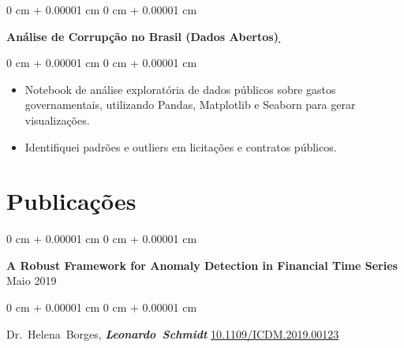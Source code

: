 \documentclass[10pt, letterpaper]{article}
\newenvironment{highlights}{
    \begin{itemize}[
        topsep=0.10 cm,
        parsep=0.10 cm,
        partopsep=0pt,
        itemsep=0pt,
        leftmargin=0 cm + 10pt
    ]
}{
    \end{itemize}
}
\newenvironment{onecolentry}{
    \begin{adjustwidth}{
        0 cm + 0.00001 cm
    }{
        0 cm + 0.00001 cm
    }
}{
    \end{adjustwidth}
}
\begin{document}
    \begin{onecolentry}
        \textbf{Análise de Corrupção no Brasil (Dados Abertos)}\href{https://github.com/leoschmidt/analise-corrupcao-br}{\, \faGithub}
    \end{onecolentry}
    \vspace{0.10cm}
    \begin{onecolentry}
        \begin{highlights}
                    \item Notebook de análise exploratória de dados públicos sobre gastos governamentais, utilizando Pandas, Matplotlib e Seaborn para gerar visualizações.
                \item Identifiquei padrões e outliers em licitações e contratos públicos.
        \end{highlights}
    \end{onecolentry}
    
\section{Publicações}

    \begin{onecolentry}
        \setcolumnwidth{\fill, 4.5cm}
        \begin{paracol}{2}
            \textbf{A Robust Framework for Anomaly Detection in Financial Time Series}
            \switchcolumn
            \raggedleft Maio 2019
        \end{paracol}
    \end{onecolentry}
    \vspace{0.10cm}
    \begin{onecolentry}
        \mbox{Dr. Helena Borges}, \mbox{\textbf{\textit{Leonardo Schmidt}}}
        \vspace{0.10cm}
        \href{https://doi.org/10.1109/ICDM.2019.00123}{10.1109/ICDM.2019.00123}
    \end{onecolentry}
    
\end{document}

